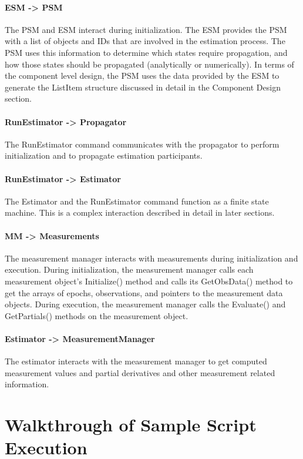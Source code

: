 \paragraph{ESM -> PSM}  The PSM and ESM interact during initialization.  The ESM provides the PSM
with a list of objects and IDs that are involved in the estimation process.  The PSM uses this
information to determine which states require propagation, and how those states should be propagated
(analytically or numerically).  In terms of the component level design, the PSM uses the data
provided by the ESM to generate the ListItem structure discussed in detail in the Component Design
section.

\paragraph{RunEstimator -> Propagator}  The RunEstimator command communicates with the propagator to
perform initialization and to propagate estimation participants.

\paragraph{RunEstimator -> Estimator}  The Estimator and the RunEstimator command function as a
finite state machine.  This is a complex interaction described in detail in later sections.

\paragraph{MM -> Measurements}  The measurement manager interacts with measurements during
initialization and execution.  During initialization, the measurement manager calls each measurement
object's Initialize() method and calls its GetObsData() method to get the arrays of epochs,
observations, and pointers to the measurement data objects.  During execution, the measurement
manager calls the Evaluate() and GetPartials() methods on the measurement object.

\paragraph{Estimator -> MeasurementManager}  The estimator interacts with the measurement manager to
get computed measurement values and partial derivatives and other measurement related information.

\section{Walkthrough of Sample Script Execution}

